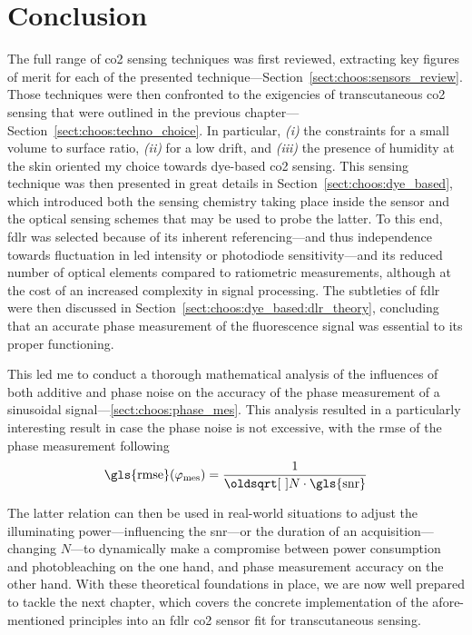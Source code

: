 \clearpage


\section{Conclusion}\label{sect:choos:conclusion}

The full range of \gls{co2} sensing techniques was first reviewed, extracting key figures of merit for each of the presented technique---Section~\ref{sect:choos:sensors_review}. Those techniques were then confronted to the exigencies of transcutaneous \gls{co2} sensing that were outlined in the previous chapter---Section~\ref{sect:choos:techno_choice}. In particular, \textit{(i)} the constraints for a small volume to surface ratio, \textit{(ii)} for a low drift, and \textit{(iii)} the presence of humidity at the skin oriented my choice towards dye-based \gls{co2} sensing. This sensing technique was then presented in great details in Section~\ref{sect:choos:dye_based}, which introduced both the sensing chemistry taking place inside the sensor and the optical sensing schemes that may be used to probe the latter. To this end, \gls{fdlr} was selected because of its inherent referencing---and thus independence towards fluctuation in \gls{led} intensity or photodiode sensitivity---and its reduced number of optical elements compared to ratiometric measurements, although at the cost of an increased complexity in signal processing. The subtleties of \gls{fdlr} were then discussed in Section~\ref{sect:choos:dye_based:dlr_theory}, concluding that an accurate phase measurement of the fluorescence signal was essential to its proper functioning.

This led me to conduct a thorough mathematical analysis of the influences of both additive and phase noise on the accuracy of the phase measurement of a sinusoidal signal---\ref{sect:choos:phase_mes}. This analysis resulted in a particularly interesting result in case the phase noise is not excessive, with the \gls{rmse} of the phase measurement following
\begin{equation}
	\text{\gls{rmse}}(\varphi_\text{mes}) = \frac{1}{\sqrt{N \cdot \text{\gls{snr}}}}
\end{equation}

The latter relation can then be used in real-world situations to adjust the illuminating power---influencing the \gls{snr}---or the duration of an acquisition---changing $N$---to dynamically make a compromise between power consumption and photobleaching on the one hand, and phase measurement accuracy on the other hand. With these theoretical foundations in place, we are now well prepared to tackle the next chapter, which covers the concrete implementation of the afore-mentioned principles into an \gls{fdlr} \gls{co2} sensor fit for transcutaneous sensing.